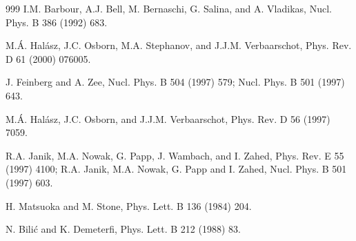 \begin{thebibliography}{999}
  I.M. Barbour, A.J. Bell, M. Bernaschi, G. Salina, and
                      A. Vladikas, 
                      Nucl. Phys. B 386 (1992) 683.              %

     M.\'A. Hal\'asz, J.C. Osborn, M.A. Stephanov,
                      and J.J.M. Verbaarschot, 
                      Phys. Rev. D 61 (2000) 076005.

      J. Feinberg and A. Zee, 
                      Nucl. Phys. B 504 (1997) 579;                %
                      Nucl. Phys. B 501 (1997) 643.                %

    M.\'A. Hal\'asz, J.C. Osborn, and J.J.M. Verbaarschot,
                      Phys. Rev. D 56 (1997) 7059.                  %

       R.A. Janik, M.A. Nowak, G. Papp, J. Wambach, and
                      I. Zahed, 
                      Phys. Rev. E 55 (1997) 4100;             %
                      R.A. Janik, M.A. Nowak, G. Papp and I. Zahed, 
                      Nucl. Phys. B 501 (1997) 603.            %

    H. Matsuoka and M. Stone, 
                      Phys. Lett. B 136 (1984) 204.            %

       N. Bili\'c and K. Demeterfi, 
                      Phys. Lett. B 212 (1988) 83.             %


\end{thebibliography}
